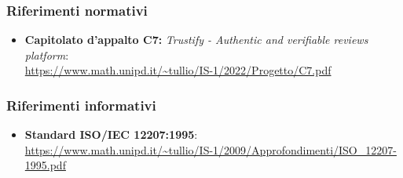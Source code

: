         \subsubsection{Riferimenti normativi}
            \begin{itemize}
                \item \textbf{Capitolato d'appalto C7:} \textit{Trustify - Authentic and verifiable reviews platform}: \\
                \url{https://www.math.unipd.it/~tullio/IS-1/2022/Progetto/C7.pdf}
            \end{itemize}
        \subsubsection{Riferimenti informativi}
            \begin{itemize}
                \item \textbf{Standard ISO/IEC 12207:1995}: \\
                \url{https://www.math.unipd.it/~tullio/IS-1/2009/Approfondimenti/ISO_12207-1995.pdf}
            \end{itemize}